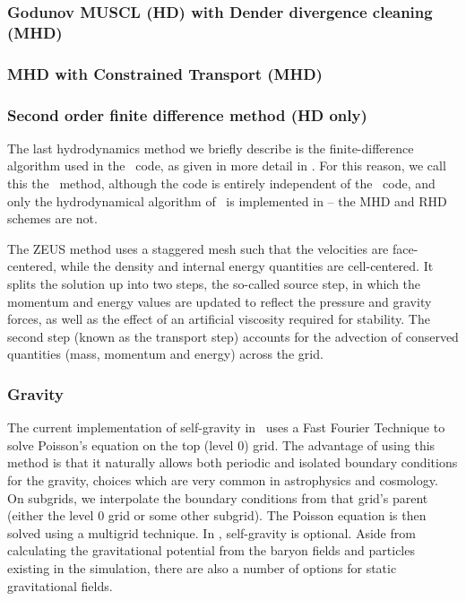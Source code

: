 
\subsubsection{Godunov MUSCL (HD) with Dender divergence cleaning (MHD)}

\subsubsection{MHD with Constrained Transport (MHD)}

\subsubsection{Second order finite difference method (HD only)}

The last hydrodynamics method we briefly describe is the
finite-difference algorithm used in the \zeus\ code, as given in more
detail in \citet{Stone92a}.  For this reason, we call this the \zeus\
method, although the code is entirely independent of the \zeus\ code,
and only the hydrodynamical algorithm of \zeus\ is implemented in
\enzo -- the MHD and RHD schemes are not.

The ZEUS method uses a staggered mesh such that the velocities are
face-centered, while the density and internal energy quantities are
cell-centered.  It splits the solution up into two steps, the
so-called source step, in which the momentum and energy values are
updated to reflect the pressure and gravity forces, as well as the
effect of an artificial viscosity required for stability.  The second
step (known as the transport step) accounts for the advection of
conserved quantities (mass, momentum and energy) across the grid.

\subsubsection{Gravity}

The current implementation of self-gravity in \enzo\ uses a Fast
Fourier Technique \citep{Hockney88} to solve Poisson's equation on the
top (level 0) grid.  The advantage of using this method is that it
naturally allows both periodic and isolated boundary conditions for
the gravity, choices which are very common in astrophysics and
cosmology.  On subgrids, we interpolate the boundary conditions from
that grid's parent (either the level 0 grid or some other subgrid).
The Poisson equation is then solved using a multigrid technique.  In
\enzo, self-gravity is optional.  Aside from calculating the
gravitational potential from the baryon fields and particles existing
in the simulation, there are also a number of options for static gravitational fields.

